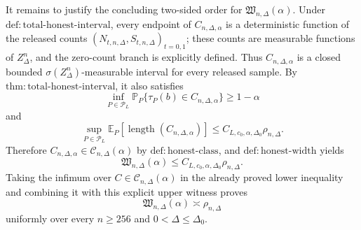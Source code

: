 It remains to justify the concluding two-sided order for \(\mathfrak W_{n,\Delta}(\alpha)\).  Under \(\mathrm{def:total\text{-}honest\text{-}interval}\), every endpoint of \(C_{n,\Delta,\alpha}\) is a deterministic function of the released counts \((N_{t,n,\Delta},S_{t,n,\Delta})_{t=0,1}\); these counts are measurable functions of \(Z_\Delta^n\), and the zero-count branch is explicitly defined.  Thus \(C_{n,\Delta,\alpha}\) is a closed bounded \(\sigma(Z_\Delta^n)\)-measurable interval for every released sample.  By \(\mathrm{thm:total\text{-}honest\text{-}interval}\), it also satisfies
\[
 \inf_{P\in\mathcal P_L}
 \mathbb P_P\{\tau_P(b)\in C_{n,\Delta,\alpha}\}
 \geq1-\alpha
\]
and
\[
 \sup_{P\in\mathcal P_L}
 \mathbb E_P[\operatorname{length}(C_{n,\Delta,\alpha})]
 \leq C_{L,c_0,\alpha,\Delta_0}\rho_{n,\Delta}.
\]
Therefore \(C_{n,\Delta,\alpha}\in\mathcal C_{n,\Delta}(\alpha)\) by \(\mathrm{def:honest\text{-}class}\), and \(\mathrm{def:honest\text{-}width}\) yields
\[
 \mathfrak W_{n,\Delta}(\alpha)
 \leq C_{L,c_0,\alpha,\Delta_0}\rho_{n,\Delta}.
\]
Taking the infimum over \(C\in\mathcal C_{n,\Delta}(\alpha)\) in the already proved lower inequality and combining it with this explicit upper witness proves
\[
 \mathfrak W_{n,\Delta}(\alpha)\asymp\rho_{n,\Delta}
\]
uniformly over every \(n\geq256\) and \(0<\Delta\leq\Delta_0\).